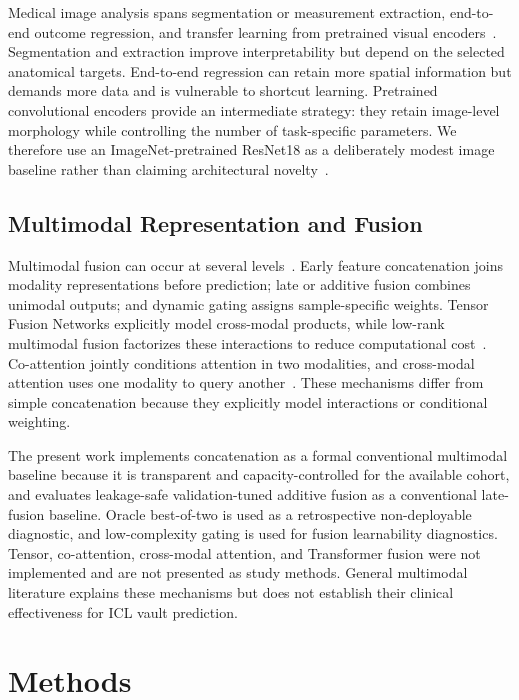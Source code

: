 \documentclass[10pt,twocolumn]{article}
\begin{document}
Medical image analysis spans segmentation or measurement extraction, end-to-end outcome regression, and transfer learning from pretrained visual encoders~\cite{medical_image_regression,ophthalmic_deep_learning}. Segmentation and extraction improve interpretability but depend on the selected anatomical targets. End-to-end regression can retain more spatial information but demands more data and is vulnerable to shortcut learning. Pretrained convolutional encoders provide an intermediate strategy: they retain image-level morphology while controlling the number of task-specific parameters. We therefore use an ImageNet-pretrained ResNet18 as a deliberately modest image baseline rather than claiming architectural novelty~\cite{resnet,imagenet}.

\subsection{Multimodal Representation and Fusion}

Multimodal fusion can occur at several levels~\cite{multimodal_learning_survey,huang_medical_fusion_review}. Early feature concatenation joins modality representations before prediction; late or additive fusion combines unimodal outputs; and dynamic gating assigns sample-specific weights. Tensor Fusion Networks explicitly model cross-modal products, while low-rank multimodal fusion factorizes these interactions to reduce computational cost~\cite{tfn,lmf}. Co-attention jointly conditions attention in two modalities, and cross-modal attention uses one modality to query another~\cite{coattention,mult}. These mechanisms differ from simple concatenation because they explicitly model interactions or conditional weighting.

The present work implements concatenation as a formal conventional multimodal baseline because it is transparent and capacity-controlled for the available cohort, and evaluates leakage-safe validation-tuned additive fusion as a conventional late-fusion baseline. Oracle best-of-two is used as a retrospective non-deployable diagnostic, and low-complexity gating is used for fusion learnability diagnostics. Tensor, co-attention, cross-modal attention, and Transformer fusion were not implemented and are not presented as study methods. General multimodal literature explains these mechanisms but does not establish their clinical effectiveness for ICL vault prediction.

\section{Methods}
\end{document}
